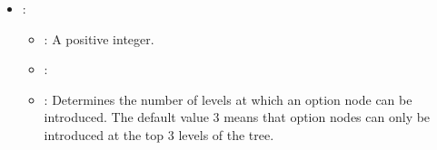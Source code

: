 \begin{itemize}
\begin{itemize}
           \end{itemize}
    \item {}:
           \begin{itemize}
                \item \optionPossibleValues{}: A positive integer.
                \item \optionDefaultValue{}: 
                \item \optionDescrption{}: Determines the number of levels at which an option node can be introduced. The default value 3 means that option nodes can only be introduced at the top 3 levels of the tree.
           \end{itemize}
\end{itemize}
